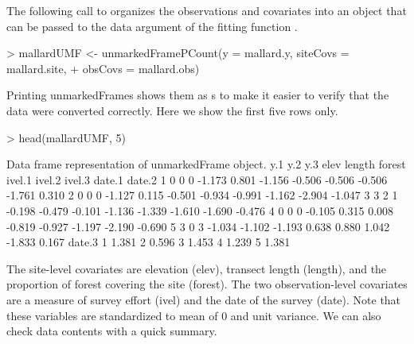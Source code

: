 \documentclass[article,shortnames]{jss}
\begin{document}
The following call to  organizes the observations 
and covariates into an object that can be passed to the data argument of
the fitting function .

\begin{Schunk}
\begin{Sinput}
> mallardUMF <- unmarkedFramePCount(y = mallard.y, siteCovs = mallard.site, 
+     obsCovs = mallard.obs)
\end{Sinput}
\end{Schunk}

Printing unmarkedFrames shows them as s to make it easier 
to verify that the data were converted correctly. Here we show the first 
five rows only. 

\begin{Schunk}
\begin{Sinput}
> head(mallardUMF, 5)
\end{Sinput}
\begin{Soutput}
Data frame representation of unmarkedFrame object.
  y.1 y.2 y.3   elev length forest ivel.1 ivel.2 ivel.3 date.1 date.2
1   0   0   0 -1.173  0.801 -1.156 -0.506 -0.506 -0.506 -1.761  0.310
2   0   0   0 -1.127  0.115 -0.501 -0.934 -0.991 -1.162 -2.904 -1.047
3   3   2   1 -0.198 -0.479 -0.101 -1.136 -1.339 -1.610 -1.690 -0.476
4   0   0   0 -0.105  0.315  0.008 -0.819 -0.927 -1.197 -2.190 -0.690
5   3   0   3 -1.034 -1.102 -1.193  0.638  0.880  1.042 -1.833  0.167
  date.3
1  1.381
2  0.596
3  1.453
4  1.239
5  1.381
\end{Soutput}
\end{Schunk}

The site-level covariates are elevation (elev), transect length (length), 
and the proportion of forest covering the site (forest).  The two 
observation-level covariates are a measure of survey effort (ivel) and the date 
of the survey (date).  Note that these variables are standardized to 
mean of 0 and unit variance.  We can also check data contents with a 
quick summary.
\end{document}

